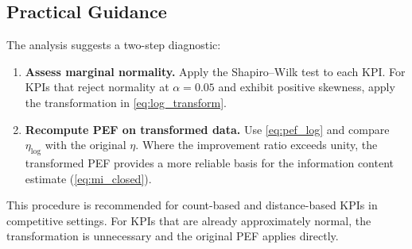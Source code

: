 \subsection{Practical Guidance}

The analysis suggests a two-step diagnostic:
\begin{enumerate}
  \item \textbf{Assess marginal normality.} Apply the Shapiro--Wilk test to each KPI. For KPIs that reject normality at $\alpha=0.05$ and exhibit positive skewness, apply the transformation in \cref{eq:log_transform}.
  \item \textbf{Recompute PEF on transformed data.} Use \cref{eq:pef_log} and compare $\eta_{\log}$ with the original $\eta$. Where the improvement ratio exceeds unity, the transformed PEF provides a more reliable basis for the information content estimate (\cref{eq:mi_closed}).
\end{enumerate}
This procedure is recommended for count-based and distance-based KPIs in competitive settings. For KPIs that are already approximately normal, the transformation is unnecessary and the original PEF applies directly.
